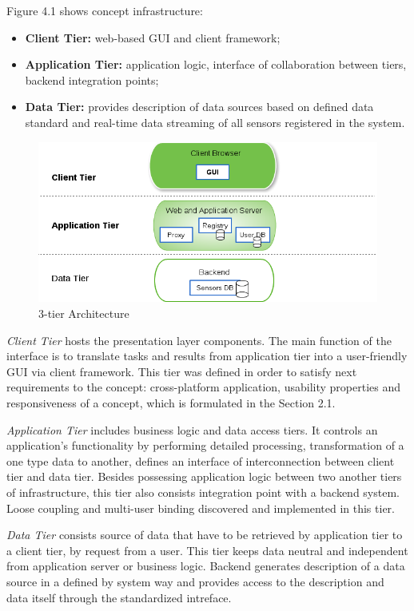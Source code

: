   Figure 4.1 shows concept infrastructure:
  \begin{itemize}
  \item \textbf{Client Tier:} web-based GUI and client framework;
  \item \textbf{Application Tier:} application logic, interface of collaboration between tiers, backend integration points;
  \item \textbf{Data Tier:} provides description of data sources based on defined data standard and real-time data streaming of all sensors registered in the system.
  \end{itemize} 
  \begin{figure}[!ht]
  \centering
  \includegraphics[scale=0.7]{images/3tier.png}   
  \caption[3-tier Architecture]{3-tier Architecture}
  \label{img:3-tier Architecture}                           
  \end{figure}

  \emph{Client Tier} hosts the presentation layer components. The main function of the interface is to translate tasks and results from application tier into a user-friendly GUI via client framework. This tier was defined in order to satisfy next requirements to the concept: cross-platform application, usability properties and responsiveness of a concept, which is formulated in the Section 2.1.

  \emph{Application Tier} includes business logic and data access tiers. It controls an application's functionality by performing detailed processing, transformation of a one type data to another, defines an interface of interconnection between client tier and data tier. Besides possessing application logic between two another tiers of infrastructure, this tier also consists integration point with a backend system. Loose coupling and multi-user binding discovered and implemented in this tier.

  \emph{Data Tier} consists source of data that have to be retrieved by application tier to a client tier, by request from a user. This tier keeps data neutral and independent from application server or business logic. Backend generates description of a data source in a defined by system way and provides access to the description and data itself through the standardized intreface.

